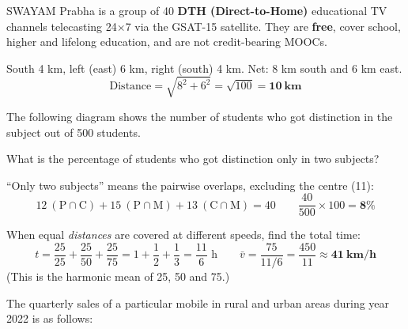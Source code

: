 SWAYAM Prabha is a group of 40 \textbf{DTH (Direct-to-Home)} educational TV channels telecasting 24$\times$7 via the GSAT-15 satellite. They are \textbf{free}, cover school, higher and lifelong education, and are not credit-bearing MOOCs.

\begin{center}
\end{center}
South 4 km, left (east) 6 km, right (south) 4 km. Net: 8 km south and 6 km east.
\[\text{Distance}=\sqrt{8^2+6^2}=\sqrt{100}=\mathbf{10\ km}\]

The following diagram shows the number of students who got distinction in the subject out of 500 students.


What is the percentage of students who got distinction only in two subjects?

``Only two subjects'' means the pairwise overlaps, excluding the centre (11):
\[12\ (\text{P}\cap\text{C})+15\ (\text{P}\cap\text{M})+13\ (\text{C}\cap\text{M})=40\qquad\frac{40}{500}\times100=\mathbf{8\%}\]

When equal \emph{distances} are covered at different speeds, find the total time:
\[t=\frac{25}{25}+\frac{25}{50}+\frac{25}{75}=1+\frac12+\frac13=\frac{11}{6}\text{ h}\qquad \bar v=\frac{75}{11/6}=\frac{450}{11}\approx\mathbf{41\ km/h}\]
(This is the harmonic mean of 25, 50 and 75.)

The quarterly sales of a particular mobile in rural and urban areas during year 2022 is as follows:

